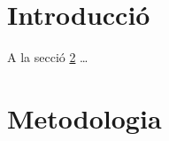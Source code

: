 \documentclass{article}
\begin{document}
\section{Introducció}
\label{sec:intro}

A la secció \ref{sec:metod} \dots

\section{Metodologia}
\label{sec:metod}
 
\end{document}
